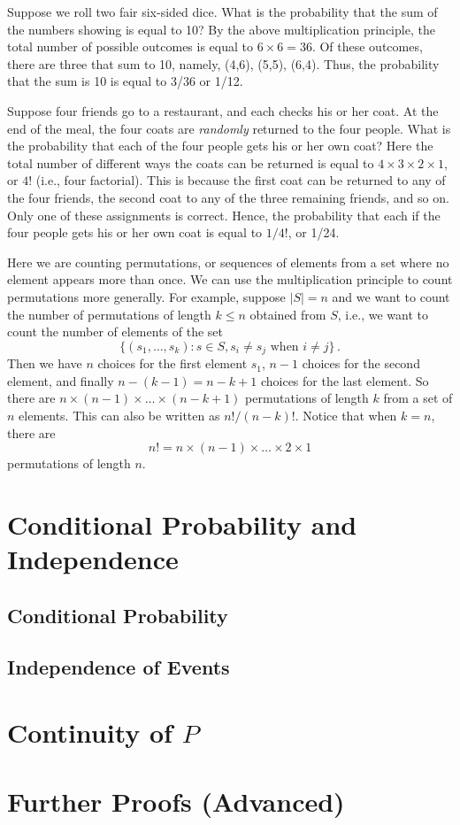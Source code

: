 \begin{example}
    Suppose we roll two fair six-sided dice. What is the probability that the sum of the numbers showing is equal to 10? By the above multiplication principle, the total number of possible outcomes is equal to $6\times6=36$. Of these outcomes, there are three that sum to 10, namely, (4,6), (5,5), (6,4). Thus, the probability that the sum is 10 is equal to 3/36 or 1/12.
\end{example}

\begin{example}
    Suppose four friends go to a restaurant, and each checks his or her coat. At the end of the meal, the four coats are \emph{randomly} returned to the four people. What is the probability that each of the four people gets his or her own coat? Here the total number of different ways the coats can be returned  is equal to $4\times3\times2\times1$, or $4!$ (i.e., four factorial). This is because the first coat can be returned to any of the four friends, the second coat to any of the three remaining friends, and so on. Only one of these assignments is correct. Hence, the probability that each if the four people gets his or her own coat is equal to $1/4!$, or 1/24.

    Here we are counting permutations, or sequences of elements from a set where no element appears more than once. We can use the multiplication principle to count permutations more generally. For example, suppose $|S|=n$ and we want to count the number of permutations of length $k \leqslant n$ obtained from $S$, i.e., we want to count the number of elements of the set
   $$
   \{(s_1,\dots,s_k):s\in S, s_i \neq s_j \text{ when } i \neq j\}\,.
   $$
   Then we have $n$ choices for the first element $s_1$, $n-1$ choices for the second element, and finally $n-(k-1)=n-k+1$ choices for the last element. So there are $n\times(n-1)\times\dots\times(n-k+1)$ permutations of length $k$ from a set of $n$ elements. This can also be written as $n! / (n-k)!$. Notice that when $k=n$, there are
   $$
   n!=n\times(n-1)\times\dots\times2\times1
   $$
   permutations of length $n$.
\end{example}

\section{Conditional Probability and Independence}\label{cond_prob_indp}
\lipsum[1-10]

\subsection{Conditional Probability}
\lipsum[1-10]

\subsection{Independence of Events}
\lipsum[1-10]

\section{Continuity of $P$}
\lipsum[1-10]

\section{Further Proofs (Advanced)}\label{ch2:adv_proofs}
\lipsum[1-10]